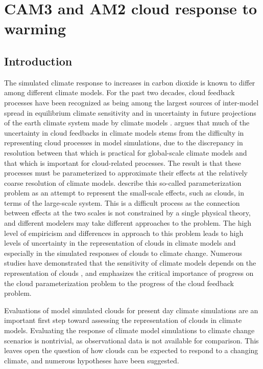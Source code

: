 \chapter{CAM3 and AM2 cloud response to warming}
\label{cmip3hot}
\section{Introduction}
The simulated climate response to increases in carbon dioxide is known to differ among different climate models. For the past two decades, cloud feedback processes have been recognized as being among the largest sources of inter-model spread in equilibrium climate sensitivity and in uncertainty in future projections of the earth climate system made by climate models \citep{cess_et_al_1990,cess_et_al_1996,colman_2003,soden_and_held_2006,webb_et_al_2006,ar4_ch8}. \cite{stephens_2005} argues that much of the uncertainty in cloud feedbacks in climate models stems from the difficulty in representing cloud processes in model simulations, due to the discrepancy in resolution between that which is practical for global-scale climate models and that which is important for cloud-related processes. The result is that these processes must be parameterized to approximate their effects at the relatively coarse resolution of climate models. \cite{randall_et_al_2003} describe this so-called parameterization problem as an attempt to represent the small-scale effects, such as clouds, in terms of the large-scale system. This is a difficult process as the connection between effects at the two scales is not constrained by a single physical theory, and different modelers may take different approaches to the problem. The high level of empiricism and differences in approach to this problem leads to high levels of uncertainty in the representation of clouds in climate models and especially in the simulated responses of clouds to climate change. Numerous studies have demonstrated that the sensitivity of climate models depends on the representation of clouds \citep[e.g.,][]{mitchell_et_al_1987,senior_and_mitchell_1993,le_treut_et_al_1994,fowler_and_randall_1994,ma_et_al_1994,liang_and_wang_1997,yao_and_del_genio_2002,zhang_2004,stainforth_et_al_2005,yokohata_et_al_2005}, and \cite{stephens_2005} emphasizes the critical importance of progress on the cloud parameterization problem to the progress of the cloud feedback problem. 

Evaluations of model simulated clouds for present day climate simulations are an important first step toward assessing the representation of clouds in climate models. Evaluating the response of climate model simulations to climate change scenarios is nontrivial, as observational data is not available for comparison. This leaves open the question of how clouds can be expected to respond to a changing climate, and numerous hypotheses have been suggested.

